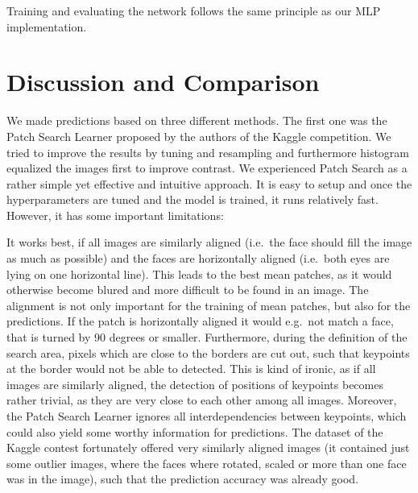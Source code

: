 \documentclass[]{article}
\newenvironment{Shaded}{\begin{snugshade}}{\end{snugshade}}
\newcommand{\KeywordTok}[1]{\textcolor[rgb]{0.13,0.29,0.53}{\textbf{{#1}}}}
\newcommand{\StringTok}[1]{\textcolor[rgb]{0.31,0.60,0.02}{{#1}}}
\newcommand{\NormalTok}[1]{{#1}}
\begin{document}
\begin{Shaded}
\end{Shaded}

Training and evaluating the network follows the same principle as our
MLP implementation.

\section{Discussion and Comparison}\label{discussion-and-comparison}

We made predictions based on three different methods. The first one was
the Patch Search Learner proposed by the authors of the Kaggle
competition. We tried to improve the results by tuning and resampling
and furthermore histogram equalized the images first to improve
contrast. We experienced Patch Search as a rather simple yet effective
and intuitive approach. It is easy to setup and once the hyperparameters
are tuned and the model is trained, it runs relatively fast. However, it
has some important limitations:

It works best, if all images are similarly aligned (i.e.~the face should
fill the image as much as possible) and the faces are horizontally
aligned (i.e.~both eyes are lying on one horizontal line). This leads to
the best mean patches, as it would otherwise become blured and more
difficult to be found in an image. The alignment is not only important
for the training of mean patches, but also for the predictions. If the
patch is horizontally aligned it would e.g.~not match a face, that is
turned by 90 degrees or smaller. Furthermore, during the definition of
the search area, pixels which are close to the borders are cut out, such
that keypoints at the border would not be able to detected. This is kind
of ironic, as if all images are similarly aligned, the detection of
positions of keypoints becomes rather trivial, as they are very close to
each other among all images. Moreover, the Patch Search Learner ignores
all interdependencies between keypoints, which could also yield some
worthy information for predictions. The dataset of the Kaggle contest
fortunately offered very similarly aligned images (it contained just
some outlier images, where the faces where rotated, scaled or more than
one face was in the image), such that the prediction accuracy was
already good.
\end{document}
